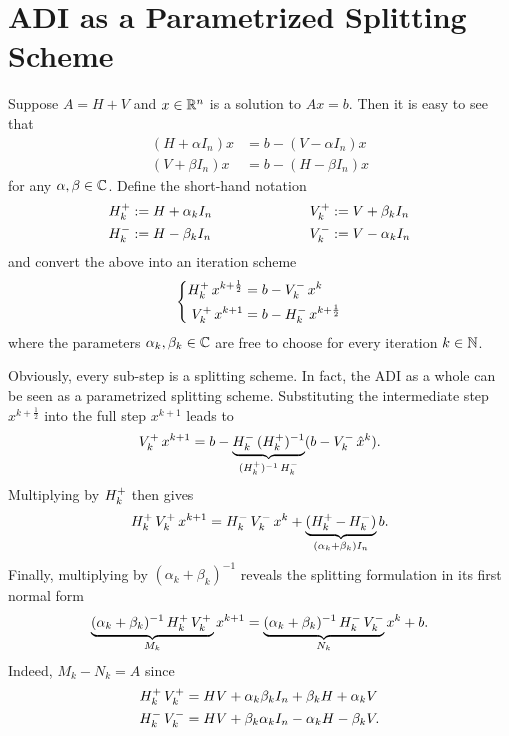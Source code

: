 
\section{ADI as a Parametrized Splitting Scheme}
\label{sec:adi:1step}

Suppose $A=H+V$ and $x\in\mathbb{R}^n$ is a solution to $Ax=b$.
Then it is easy to see that
\begin{align*}
  (H + \alpha I_n)x &= b - (V - \alpha I_n) x \\
  (V + \beta I_n)x &= b - (H - \beta I_n) x
\end{align*}
for any $\alpha, \beta \in\mathbb{C}$.
Define the short-hand notation
\begin{equation}
\label{eq:adi:shorthand}
\begin{aligned}
  \Aip  &:= H + \alpha_k I_n &
  \qquad\qquad\qquad %
  \Aiip &:= V + \beta_k  I_n \\
  \Aim  &:= H - \beta_k  I_n &
  \Aiim &:= V - \alpha_k I_n
\end{aligned}
\end{equation}
and convert the above into an iteration scheme
\begin{equation}
  \label{eq:adi:general2step}
  \left\{
  \begin{aligned}
    \mathop{H_k^+}  x^{k+\frac{1}{2}} &= b - \mathop{V_k^-} x^k \\
    \mathop{V_k^+} x^{k+1}           &= b - \mathop{H_k^-} x^{k+\frac{1}{2}}
  \end{aligned}
  \right.
\end{equation}
where the parameters $\alpha_k, \beta_k \in\mathbb{C}$ are free to choose for every iteration $k\in\mathbb{N}$.

Obviously, every sub-step is a splitting scheme.
In fact, the ADI as a whole can be seen as a parametrized splitting scheme.
Substituting the intermediate step $x^{k+\frac{1}{2}}$ into the full step $x^{k+1}$ leads to
\begin{equation*}
  \mathop{V_k^+} x^{k+1}
  = b - \underbrace{
    \mathop{H_k^-}\mathop{(\mathop{H_k^+})^{-1}}
  }_{\mathop{(\mathop{H_k^+})^{-1}}\mathop{H_k^-}}
  (b - \mathop{V_k^-} \hat x^k)
  .
\end{equation*}
Multiplying by $\mathop{H_k^+}$ then gives
\begin{equation*}
  \Aip\Aiip x^{k+1} = \Aim\Aiim x^k +
  \underbrace{%
  (\Aip - \Aim)
  }_{(\alpha_k + \beta_k) I_n}
  b
  .
\end{equation*}
Finally, multiplying by $(\alpha_k + \beta_k)^{-1}$ reveals the splitting formulation in its first normal form
\begin{equation}
\label{eq:adi:general1step}
  \underbrace{
    (\alpha_k + \beta_k)^{-1} \mathop{H_k^+}\mathop{V_k^+} \\
  }_{M_k}
  x^{k+1} =
  \underbrace{
    (\alpha_k + \beta_k)^{-1} \mathop{H_k^-}\mathop{V_k^-}
  }_{N_k}
  x^k + b
  .
\end{equation}
Indeed, $M_k - N_k = A$ since
\begin{align*}
  \mathop{H_k^+}\mathop{V_k^+} &= HV + \alpha_k\beta_k I_n + \beta_k H + \alpha_k V \\
  \mathop{H_k^-}\mathop{V_k^-} &= HV + \beta_k\alpha_k I_n - \alpha_k H - \beta_k V
  .
\end{align*}

